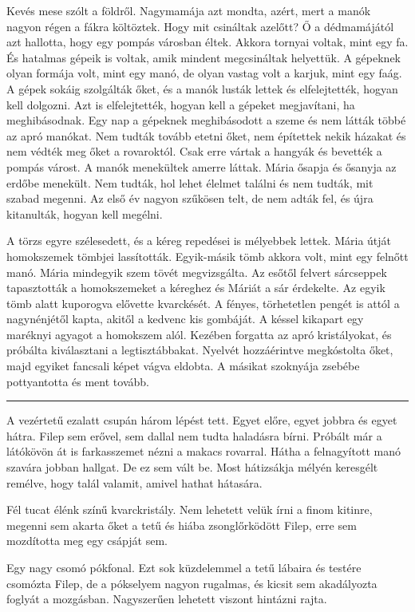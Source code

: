 \documentclass[10pt]{memoir}
\renewcommand{\pfbreakdisplay}{\bigskip \ding{166} \bigskip}
\newcommand{\secbreak}{\fancybreak{\pfbreakdisplay}\indent}
\begin{document}
Kevés mese szólt a földről. Nagymamája azt mondta, azért, mert a manók nagyon
régen a fákra költöztek. Hogy mit csináltak azelőtt? Ő a dédmamájától azt
hallotta, hogy egy pompás városban éltek. Akkora tornyai voltak, mint egy fa.
És hatalmas gépeik is voltak, amik mindent megcsináltak helyettük. A gépeknek
olyan formája volt, mint egy manó, de olyan vastag volt a karjuk, mint egy
faág. A gépek sokáig szolgálták őket, és a manók lusták lettek és
elfelejtették, hogyan kell dolgozni. Azt is elfelejtették, hogyan kell a
gépeket megjavítani, ha meghibásodnak. Egy nap a gépeknek meghibásodott a szeme
és nem látták többé az apró manókat. Nem tudták tovább etetni őket, nem
építettek nekik házakat és nem védték meg őket a rovaroktól. Csak erre vártak a
hangyák és bevették a pompás várost. A manók menekültek amerre láttak. Mária
ősapja és ősanyja az erdőbe menekült. Nem tudták, hol lehet élelmet találni és
nem tudták, mit szabad megenni. Az első év nagyon szűkösen telt, de nem adták
fel, és újra kitanulták, hogyan kell megélni.

A törzs egyre szélesedett, és a kéreg repedései is mélyebbek lettek. Mária
útját homokszemek tömbjei lassították. Egyik-másik tömb akkora volt, mint egy
felnőtt manó. Mária mindegyik szem tövét megvizsgálta.  Az esőtől felvert
sárcseppek tapasztották a homokszemeket a kéreghez és Máriát a sár érdekelte.
Az egyik tömb alatt kuporogva elővette kvarckését. A fényes, törhetetlen pengét
is attól a nagynénjétől kapta, akitől a kedvenc kis gombáját. A késsel kikapart
egy maréknyi agyagot a homokszem alól. Kezében forgatta az apró kristályokat,
és próbálta kiválasztani a legtisztábbakat. Nyelvét hozzáérintve megkóstolta
őket, majd egyiket fancsali képet vágva eldobta. A másikat szoknyája zsebébe
pottyantotta és ment tovább.

\secbreak

A vezértetű ezalatt csupán három lépést tett. Egyet előre, egyet jobbra és
egyet hátra. Filep sem erővel, sem dallal nem tudta haladásra bírni. Próbált
már a látókövön át is farkasszemet nézni a makacs rovarral. Hátha a
felnagyított manó szavára jobban hallgat. De ez sem vált be. Most hátizsákja
mélyén keresgélt remélve, hogy talál valamit, amivel hathat hátasára.

Fél tucat élénk színű kvarckristály. Nem lehetett velük írni a finom kitinre,
megenni sem akarta őket a tetű és hiába zsonglőrködött Filep, erre sem
mozdította meg egy csápját sem.

Egy nagy csomó pókfonal. Ezt sok küzdelemmel a tetű lábaira és testére csomózta
Filep, de a pókselyem nagyon rugalmas, és kicsit sem akadályozta foglyát a
mozgásban. Nagyszerűen lehetett viszont hintázni rajta.
\end{document}
